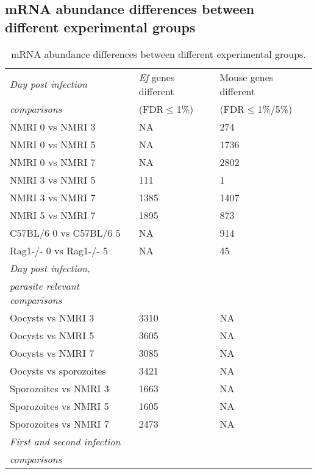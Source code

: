 \documentclass{bmcart}
\begin{document}
\begin{backmatter}

\clearpage
\section{mRNA abundance differences between different experimental groups}
\setlength{\tabcolsep}{8pt}
\begin{table}[H]
\small
\begin{center}
\caption{mRNA abundance differences between different experimental groups.}
\begin{tabular}{*3l}    \toprule
\textit{Day post infection} & \textit{Ef} genes different & Mouse genes different \\ 
	\textit{comparisons} 	    & (FDR$\leq$1\%) &  (FDR$\leq$1\%/5\%) \\ \midrule
	NMRI 0 vs NMRI 3		& NA   & 274 \\
	NMRI 0 vs NMRI 5		& NA   & 1736 \\
	NMRI 0 vs NMRI 7		& NA   & 2802 \\
	NMRI 3 vs NMRI 5     		& 111  & 1 \\
	NMRI 3 vs NMRI 7  		& 1385 & 1407 \\ 
	NMRI 5 vs NMRI 7  		& 1895 & 873 \\ 
	C57BL/6 0 vs C57BL/6 5		& NA	& 914 \\
	Rag1-/- 0 vs Rag1-/- 5		& NA	& 45 \\ \midrule
\textit{Day post infection,} & 		 & 		 \\ 
\textit{parasite relevant comparisons} 	    & 		&  \\ \midrule
	Oocysts vs NMRI 3  	& 3310 & NA \\  
	Oocysts vs NMRI 5	& 3605 & NA \\ 
	Oocysts vs NMRI 7	& 3085 & NA \\ 
	Oocysts vs sporozoites  & 3421 & NA \\
	Sporozoites vs NMRI 3 	& 1663 & NA \\
	Sporozoites vs NMRI 5 	& 1605 & NA \\
	Sporozoites vs NMRI 7 	& 2473 & NA \\ \midrule
\textit{First and second infection} & 		 & 	 \\ 
\textit{comparisons} 	    & 		& 	\\ \midrule

\end{tabular}
\end{center}
\end{table}
\end{backmatter}
\end{document}
